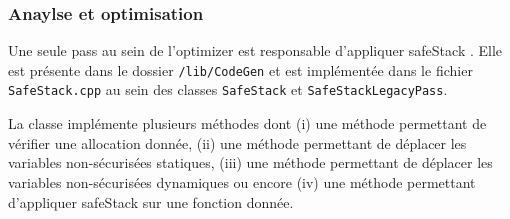 \subsubsection{Anaylse et optimisation}

Une seule \og pass \fg au sein de l'\og optimizer \fg est responsable d'appliquer \og \gls{safeStack} \fg. Elle est présente dans le dossier \texttt{/lib/CodeGen} et est implémentée dans le fichier \texttt{SafeStack.cpp} au sein des classes \texttt{SafeStack} et \texttt{SafeStackLegacyPass}.

La classe implémente plusieurs méthodes dont (i) une méthode permettant de vérifier une allocation donnée, (ii) une méthode permettant de déplacer les variables non-sécurisées statiques, (iii) une méthode permettant de déplacer les variables non-sécurisées dynamiques ou encore (iv) une méthode permettant d'appliquer \og \gls{safeStack} \fg sur une fonction donnée.

\newpage

